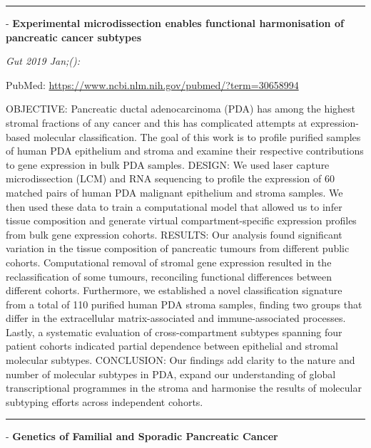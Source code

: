 \documentclass[]{article}
\begin{document}
{}

{}

\begin{center}\rule{0.5\linewidth}{\linethickness}\end{center}

 - \textbf{Experimental microdissection enables functional harmonisation
of pancreatic cancer subtypes}

\emph{Gut 2019 Jan;():}

PubMed: \url{https://www.ncbi.nlm.nih.gov/pubmed/?term=30658994}

OBJECTIVE: Pancreatic ductal adenocarcinoma (PDA) has among the highest
stromal fractions of any cancer and this has complicated attempts at
expression-based molecular classification. The goal of this work is to
profile purified samples of human PDA epithelium and stroma and examine
their respective contributions to gene expression in bulk PDA samples.
DESIGN: We used laser capture microdissection (LCM) and RNA sequencing
to profile the expression of 60 matched pairs of human PDA malignant
epithelium and stroma samples. We then used these data to train a
computational model that allowed us to infer tissue composition and
generate virtual compartment-specific expression profiles from bulk gene
expression cohorts. RESULTS: Our analysis found significant variation in
the tissue composition of pancreatic tumours from different public
cohorts. Computational removal of stromal gene expression resulted in
the reclassification of some tumours, reconciling functional differences
between different cohorts. Furthermore, we established a novel
classification signature from a total of 110 purified human PDA stroma
samples, finding two groups that differ in the extracellular
matrix-associated and immune-associated processes. Lastly, a systematic
evaluation of cross-compartment subtypes spanning four patient cohorts
indicated partial dependence between epithelial and stromal molecular
subtypes. CONCLUSION: Our findings add clarity to the nature and number
of molecular subtypes in PDA, expand our understanding of global
transcriptional programmes in the stroma and harmonise the results of
molecular subtyping efforts across independent cohorts.

{}

{}

\begin{center}\rule{0.5\linewidth}{\linethickness}\end{center}

 - \textbf{Genetics of Familial and Sporadic Pancreatic Cancer}
\end{document}
